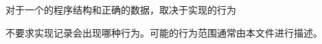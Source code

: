 对于一个\wellform{}的程序结构和正确的数据，取决于实现的行为

\begin{note}[\noindent]
不要求实现记录会出现哪种行为。可能的行为范围通常由本文件进行描述。
\end{note}
